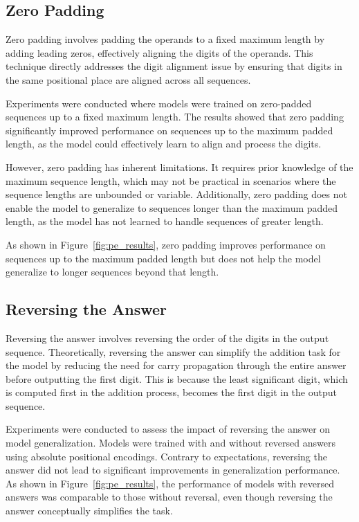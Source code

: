 \subsection{Zero Padding}

Zero padding involves padding the operands to a fixed maximum length by adding leading zeros, effectively aligning the digits of the operands. This technique directly addresses the digit alignment issue by ensuring that digits in the same positional place are aligned across all sequences.

Experiments were conducted where models were trained on zero-padded sequences up to a fixed maximum length. The results showed that zero padding significantly improved performance on sequences up to the maximum padded length, as the model could effectively learn to align and process the digits.

However, zero padding has inherent limitations. It requires prior knowledge of the maximum sequence length, which may not be practical in scenarios where the sequence lengths are unbounded or variable. Additionally, zero padding does not enable the model to generalize to sequences longer than the maximum padded length, as the model has not learned to handle sequences of greater length.

As shown in Figure~\ref{fig:pe_results}, zero padding improves performance on sequences up to the maximum padded length but does not help the model generalize to longer sequences beyond that length.

\subsection{Reversing the Answer}

Reversing the answer involves reversing the order of the digits in the output sequence. Theoretically, reversing the answer can simplify the addition task for the model by reducing the need for carry propagation through the entire answer before outputting the first digit. This is because the least significant digit, which is computed first in the addition process, becomes the first digit in the output sequence.

Experiments were conducted to assess the impact of reversing the answer on model generalization. Models were trained with and without reversed answers using absolute positional encodings. Contrary to expectations, reversing the answer did not lead to significant improvements in generalization performance. As shown in Figure~\ref{fig:pe_results}, the performance of models with reversed answers was comparable to those without reversal, even though reversing the answer conceptually simplifies the task.

